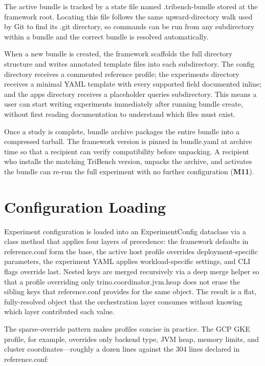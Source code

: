 \documentclass{l4proj}
\begin{document}
The active bundle is tracked by a state file named .tribench-bundle stored at the framework root. Locating this file follows the same upward-directory walk used by Git to find its .git directory, so commands can be run from any subdirectory within a bundle and the correct bundle is resolved automatically.

When a new bundle is created, the framework scaffolds the full directory structure and writes annotated template files into each subdirectory. The config directory receives a commented reference profile; the experiments directory receives a minimal YAML template with every supported field documented inline; and the apps directory receives a placeholder queries subdirectory. This means a user can start writing experiments immediately after running bundle create, without first reading documentation to understand which files must exist.

Once a study is complete, bundle archive packages the entire bundle into a compressed tarball. The framework version is pinned in bundle.yaml at archive time so that a recipient can verify compatibility before unpacking. A recipient who installs the matching TriBench version, unpacks the archive, and activates the bundle can re-run the full experiment with no further configuration (\textbf{M11}).

\section{Configuration Loading}
\label{sec:impl_config}

Experiment configuration is loaded into an ExperimentConfig dataclass via a class method that applies four layers of precedence: the framework defaults in reference.conf form the base, the active host profile overrides deployment-specific parameters, the experiment YAML applies workload-specific settings, and CLI flags override last. Nested keys are merged recursively via a deep merge helper so that a profile overriding only trino.coordinator.jvm.heap does not erase the sibling keys that reference.conf provides for the same object. The result is a flat, fully-resolved object that the orchestration layer consumes without knowing which layer contributed each value.

The sparse-override pattern makes profiles concise in practice. The GCP GKE profile, for example, overrides only backend type, JVM heap, memory limits, and cluster coordinates---roughly a dozen lines against the 304 lines declared in reference.conf:
\end{document}
